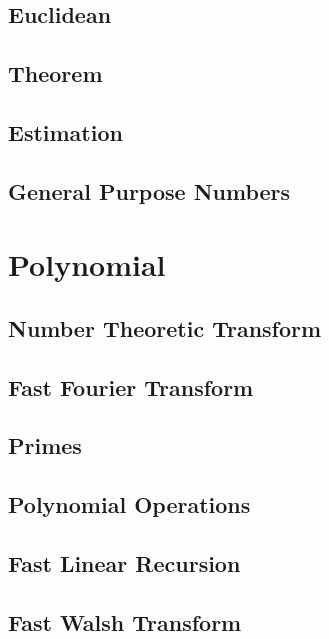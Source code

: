 \subsection{Euclidean}

\subsection{Theorem}

\subsection{Estimation}

\subsection{General Purpose Numbers}

% 

\section{Polynomial}
\subsection{Number Theoretic Transform}

\subsection{Fast Fourier Transform}

\subsection{Primes}

\subsection{Polynomial Operations}

\subsection{Fast Linear Recursion}

\subsection{Fast Walsh Transform}


